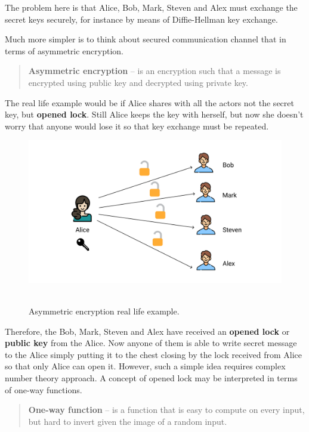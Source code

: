 \documentclass[12pt,letterpaper,oneside,reqno]{amsart}
\begin{document}
    The problem here is that Alice, Bob, Mark, Steven and Alex must exchange the secret keys securely,
    for instance by means of Diffie-Hellman key exchange.

    Much more simpler is to think about secured communication channel that in terms of asymmetric encryption.
    \begin{quote}
        \textbf{Asymmetric encryption} -- is an encryption such that a message is encrypted using public key and
        decrypted using private key.
    \end{quote}
    The real life example would be if Alice shares with all the actors not the secret key, but \textbf{opened lock}.
    Still Alice keeps the key with herself, but now she doesn't worry that anyone would lose it so that key exchange must be repeated.
    \begin{figure}[H]
        \centering
        \includegraphics[width=1.15\textwidth]{Asymmetric_encryption}
        ~\caption{Asymmetric encryption real life example.}\label{fig:figure2}
    \end{figure}
    Therefore, the Bob, Mark, Steven and Alex have received an \textbf{opened lock} or \textbf{public key} from the Alice.
    Now anyone of them is able to write secret message to the Alice simply putting it to the chest closing by the lock
    received from Alice so that only Alice can open it.
    However, such a simple idea requires complex number theory approach.
    A concept of opened lock may be interpreted in terms of one-way functions.
    \begin{quote}
        \textbf{One-way function} -- is a function that is easy to compute on every input, but hard to invert given the image of
        a random input.
    \end{quote}
\end{document}
